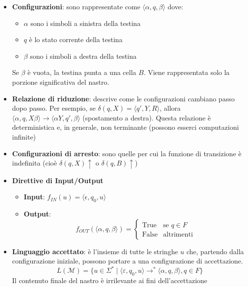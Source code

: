 \documentclass[12pt, a4paper]{report}
\begin{document}
            \begin{itemize}
                \item \textbf{Configurazioni}: sono rappresentate come $\langle \alpha, q, \beta \rangle$ dove: \begin{itemize}
                    \item $\alpha$ sono i simboli a sinistra della testina
                    \item $q$ è lo stato corrente della testina
                    \item $\beta$ sono i simboli a destra della testina
                \end{itemize}
                Se $\beta$ è vuota, la testina punta a una cella $B$. Viene rappresentata solo la porzione significativa del nastro.
                \item \textbf{Relazione di riduzione}: descrive come le configurazioni cambiano passo dopo passo. Per esempio, se $\delta(q, X) = \langle q', Y, R \rangle$, allora $\langle \alpha, q, X\beta \rangle \to \langle \alpha Y, q', \beta \rangle$ (spostamento a destra). Questa relazione è deterministica e, in generale, non terminante (possono esserci computazioni infinite)
                \item \textbf{Configurazioni di arresto}: sono quelle per cui la funzione di transizione è indefinita (cioè $\delta(q, X)\uparrow$ o $\delta(q, B)\uparrow$)
                \item \textbf{Direttive di Input/Output} \begin{itemize}
                    \item \textbf{Input}: $f_{IN}(u) = \langle \epsilon, q_0, u \rangle$
                    \item \textbf{Output}: $$f_{OUT}(\langle \alpha, q, \beta \rangle)=\begin{cases}
                        \text{True} & \text{se } q\in F\\
                        \text{False} & \text{altrimenti}
                    \end{cases}$$
                \end{itemize}
                \item \textbf{Linguaggio accettato}: è l'insieme di tutte le stringhe $u$ che, partendo dalla configurazione iniziale, possono portare a una configurazione di accettazione. $$L(\mathcal{M}) = \{u \in \Sigma^* \mid \langle \varepsilon, q_0, u \rangle \to^* \langle \alpha, q, \beta \rangle, q \in F\}$$ Il contenuto finale del nastro è irrilevante ai fini dell'accettazione
            \end{itemize}
\end{document}
